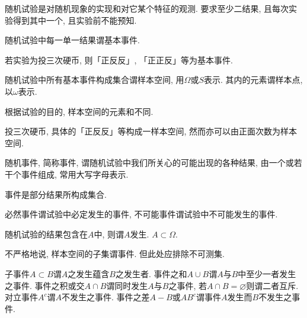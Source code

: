 \documentclass{ctexart}
\begin{document}
\begin{definition}
    随机试验是对随机现象的实现和对它某个特征的观测. 要求至少二结果, 且每次实验得到其中一个, 且实验前不能预知.
\end{definition}
\begin{definition}
    随机试验中每一单一结果谓基本事件.
\end{definition}
\begin{sample}
    \begin{ex}
        若实验为投三次硬币, 则「正反反」, 「正正反」等为基本事件.
    \end{ex}
\end{sample}
\begin{definition}
    随机试验中所有基本事件构成集合谓样本空间, 用$\Omega$或$S$表示. 其内的元素谓样本点, 以$\omega$表示.
\end{definition}
\begin{remark}
    根据试验的目的, 样本空间的元素和不同.
\end{remark}
\begin{sample}
    \begin{ex}
        投三次硬币, 具体的「正反反」等构成一样本空间, 然而亦可以由正面次数为样本空间.
    \end{ex}
\end{sample}
\begin{definition}
    随机事件, 简称事件, 谓随机试验中我们所关心的可能出现的各种结果, 由一个或若干个事件组成, 常用大写字母表示.
\end{definition}
\begin{finale}
    事件是部分结果所构成集合.
\end{finale}
\begin{definition}
    必然事件谓试验中必定发生的事件, 不可能事件谓试验中不可能发生的事件.
\end{definition}
\begin{definition}
    随机试验的结果包含在$A$中, 则谓$A$发生. $A\subset \Omega$.
\end{definition}
\begin{remark}
    不严格地说, 样本空间的子集谓事件. 但此处应排除不可测集.
\end{remark}
\begin{definition}
    子事件$A\subset B$谓$A$之发生蕴含$B$之发生者. 事件之和$A\cup B$谓$A$与$B$中至少一者发生之事件. 事件之积或交$A\cap B$谓同时发生$A$与$B$之事件, 若$A\cap B = \varnothing$则谓二者互斥. 对立事件$A^c$谓$A$不发生之事件. 事件之差$A-B$或$AB^c$谓事件$A$发生而$B$不发生之事件.
\end{definition}
\end{document}
